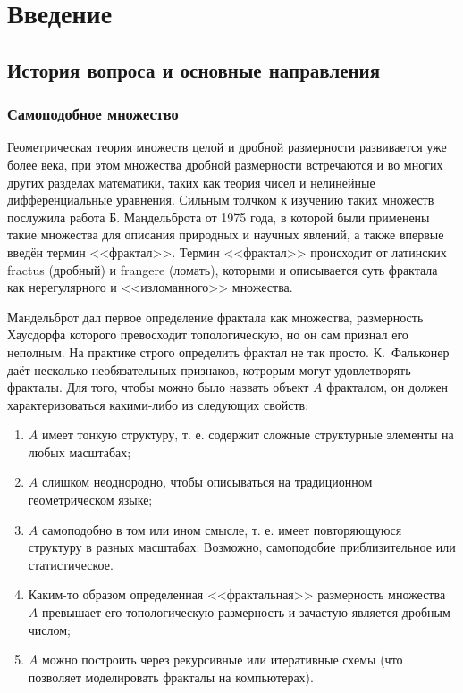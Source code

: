 \chapter*{Введение}                         %


\section{История вопроса и основные направления}


\subsection{Самоподобное множество}

Геометрическая теория множеств целой и дробной размерности развивается уже более века, при этом множества дробной размерности встречаются и во многих других разделах математики, таких как теория чисел и нелинейные дифференциальные уравнения.
Сильным толчком к изучению таких множеств послужила работа \cite{Man75} Б. Мандельброта от 1975 года, в которой были применены такие множества для описания природных и научных явлений, а также впервые введён термин <<фрактал>>.
Термин <<фрактал>> происходит от латинских fractus (дробный) и frangere (ломать), которыми и описывается суть фрактала как нерегулярного и <<изломанного>> множества.

Мандельброт дал первое определение фрактала как множества, размерность Хаусдорфа которого превосходит топологическую, но он сам признал его неполным.
На практике строго определить фрактал не так просто.
К.~Фальконер \cite{Falconer2004} даёт несколько необязательных признаков, котрорым могут удовлетворять фракталы.
Для того, чтобы можно было назвать объект $A$ фракталом, он должен характеризоваться какими-либо из следующих свойств:

\begin{enumerate}
\item $A$ имеет тонкую структуру, т. е. содержит сложные структурные элементы на любых масштабах;
\item $A$ слишком неоднородно, чтобы описываться на традиционном геометрическом языке;
\item $A$ самоподобно в том или ином смысле, т. е. имеет повторяющуюся структуру в разных масштабах. Возможно, самоподобие приблизительное или статистическое.
\item Каким-то образом определенная <<фрактальная>> размерность множества $A$ превышает его топологическую размерность и зачастую является дробным числом;
\item $A$ можно построить через рекурсивные или итеративные схемы (что позволяет моделировать фракталы на компьютерах).
\end{enumerate}


